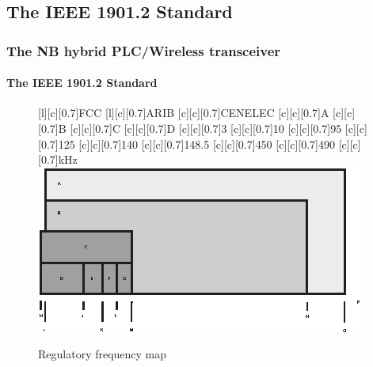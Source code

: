 \documentclass[mathserif]{beamer}
\begin{document}
\subsection{The IEEE 1901.2 Standard}
\begin{frame}
	\frametitle{The NB hybrid PLC/Wireless transceiver}
	\framesubtitle{The IEEE 1901.2 Standard}
	\renewcommand{\sizeLetter}{0.7}
	\begin{figure}[htb]
		[\sizeLetter]{FCC}
		[\sizeLetter]{ARIB}
		[\sizeLetter]{CENELEC}
		[\sizeLetter]{A}
		[\sizeLetter]{B}
		[\sizeLetter]{C}
		[\sizeLetter]{D}
		[\sizeLetter]{3}
		[\sizeLetter]{10}
		[\sizeLetter]{95}
		[\sizeLetter]{125}
		[\sizeLetter]{140}
		[\sizeLetter]{148.5}
		[\sizeLetter]{450}
		[\sizeLetter]{490}
		[\sizeLetter]{kHz}
		\centering
		\includegraphics[width=\linewidth]{figuras/freq_map}
		\caption{Regulatory frequency map}
		\label{fig:freqmap}
	\end{figure}
\end{frame}
\end{document}
